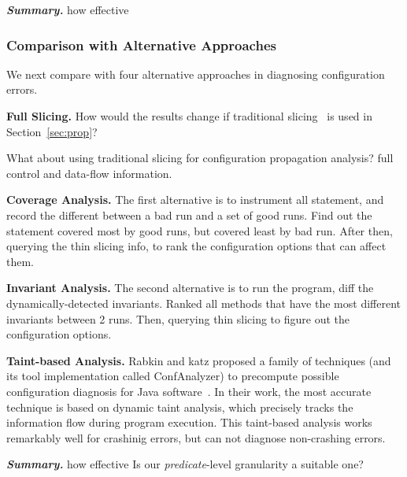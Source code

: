 \vspace{1mm}
\noindent \textbf{\textit{Summary.}} how effective


\subsubsection{Comparison with Alternative Approaches}
\label{sec:comparison}

We next compare \ourtool with four alternative approaches
in diagnosing configuration errors.

\noindent \textbf{Full Slicing.}
How would the results change if traditional slicing~\cite{Horwitz:1988} is used
in Section~\ref{sec:prop}?

What about using traditional slicing for configuration propagation analysis?
full control and data-flow information.

\vspace{1mm}
\noindent \textbf{Coverage Analysis.}
The first alternative is to instrument all statement, and record the different between a bad run and
a set of good runs. Find out the statement covered most by good runs, but covered least by bad run.
After then, querying the thin slicing info, to rank the configuration options that can affect them.

\vspace{1mm}
\noindent \textbf{Invariant Analysis.}
The second alternative is to run the program, diff the dynamically-detected invariants. Ranked all
methods that have the most different invariants between 2 runs. Then, querying thin slicing to
figure out the configuration options.


\vspace{1mm}
\noindent \textbf{Taint-based Analysis.}
Rabkin and katz proposed a family of techniques (and its tool implementation called ConfAnalyzer)
to precompute possible
configuration diagnosis for Java software~\cite{Rabkin:2011:PPC}. In their work,
the most accurate technique is based on dynamic taint analysis, which precisely
tracks the information flow during program execution. %
This taint-based analysis works remarkably well for crashinig errors, but can
not diagnose non-crashing errors.


\vspace{1mm}
\noindent \textbf{\textit{Summary.}} how effective
Is our \textit{predicate}-level granularity a suitable one?


